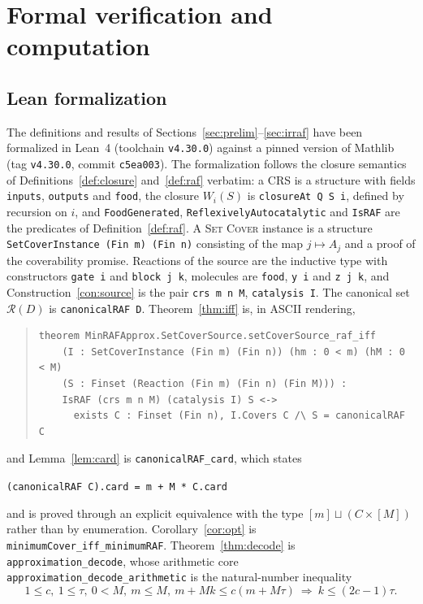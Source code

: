 \documentclass[11pt,a4paper]{article}
\theoremstyle{plain}
\theoremstyle{definition}
\theoremstyle{remark}
\newcommand{\cR}{\mathcal{R}}
\newcommand{\lean}[1]{\texttt{#1}}
\newcommand{\SetCover}{\textup{\textsc{Set Cover}}}
\begin{document}
\section{Formal verification and computation}\label{sec:verification}

\subsection{Lean formalization}

The definitions and results of Sections~\ref{sec:prelim}--\ref{sec:irraf} have been formalized in Lean~4 (toolchain \lean{v4.30.0}) against a pinned version of Mathlib (tag \lean{v4.30.0}, commit \lean{c5ea003}). The formalization follows the closure semantics of Definitions~\ref{def:closure} and~\ref{def:raf} verbatim: a CRS is a structure with fields \lean{inputs}, \lean{outputs} and \lean{food}, the closure $W_i(S)$ is \lean{closureAt Q S i}, defined by recursion on $i$, and \lean{FoodGenerated}, \lean{ReflexivelyAutocatalytic} and \lean{IsRAF} are the predicates of Definition~\ref{def:raf}. A \SetCover{} instance is a structure \lean{SetCoverInstance (Fin m) (Fin n)} consisting of the map $j\mapsto A_j$ and a proof of the coverability promise. Reactions of the source are the inductive type with constructors \lean{gate i} and \lean{block j k}, molecules are \lean{food}, \lean{y i} and \lean{z j k}, and Construction~\ref{con:source} is the pair \lean{crs m n M}, \lean{catalysis I}. The canonical set $\cR(D)$ is \lean{canonicalRAF D}. Theorem~\ref{thm:iff} is, in ASCII rendering,
\begin{quote}\small
\begin{verbatim}
theorem MinRAFApprox.SetCoverSource.setCoverSource_raf_iff
    (I : SetCoverInstance (Fin m) (Fin n)) (hm : 0 < m) (hM : 0 < M)
    (S : Finset (Reaction (Fin m) (Fin n) (Fin M))) :
    IsRAF (crs m n M) (catalysis I) S <->
      exists C : Finset (Fin n), I.Covers C /\ S = canonicalRAF C
\end{verbatim}
\end{quote}
and Lemma~\ref{lem:card} is \lean{canonicalRAF\_card}, which states
\begin{center}\small\lean{(canonicalRAF C).card = m + M * C.card}\end{center}
and is proved through an explicit equivalence with the type $[m]\sqcup(C\times[M])$ rather than by enumeration. Corollary~\ref{cor:opt} is \lean{minimumCover\_iff\_minimumRAF}. Theorem~\ref{thm:decode} is \lean{approximation\_decode}, whose arithmetic core \lean{approximation\_decode\_arithmetic} is the natural-number inequality
\[
1\le c,\ 1\le\tau,\ 0<M,\ m\le M,\ m+Mk\le c(m+M\tau)\ \Longrightarrow\ k\le(2c-1)\tau .
\]
\end{document}
